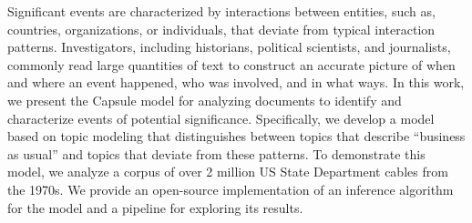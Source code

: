 
Significant events are characterized by interactions between entities,
such as, countries, organizations, or individuals, that deviate from
typical interaction patterns. Investigators, including historians,
political scientists, and journalists, commonly read large quantities
of text to construct an accurate picture of when and where an event
happened, who was involved, and in what ways. In this work, we present
the Capsule model for analyzing documents to identify and characterize
events of potential significance. Specifically, we develop a model
based on topic modeling that distinguishes between topics that
describe ``business as usual'' and topics that deviate from these
patterns. To demonstrate this model, we analyze a corpus of over 2
million US State Department cables from the 1970s. We provide an
open-source implementation of an inference algorithm for the model and
a pipeline for exploring its results.
